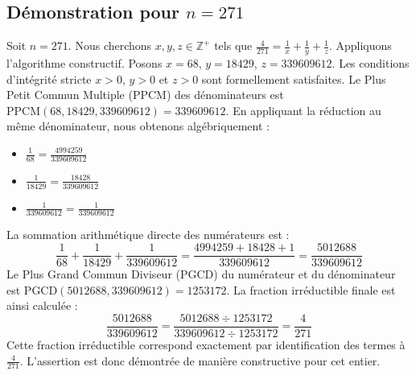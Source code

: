 \documentclass[11pt,a4paper]{article}
\begin{document}
\subsection{Démonstration pour $n = 271$}
Soit $n = 271$. Nous cherchons $x, y, z \in \mathbb{Z}^{+}$ tels que $\frac{4}{271} = \frac{1}{x} + \frac{1}{y} + \frac{1}{z}$.
Appliquons l'algorithme constructif. Posons $x = 68$, $y = 18429$, $z = 339609612$.
Les conditions d'intégrité stricte $x > 0$, $y > 0$ et $z > 0$ sont formellement satisfaites.
Le Plus Petit Commun Multiple (PPCM) des dénominateurs est $\text{PPCM}(68, 18429, 339609612) = 339609612$.
En appliquant la réduction au même dénominateur, nous obtenons algébriquement :
\begin{itemize}
    \item $\frac{1}{68} = \frac{4994259}{339609612}$
    \item $\frac{1}{18429} = \frac{18428}{339609612}$
    \item $\frac{1}{339609612} = \frac{1}{339609612}$
\end{itemize}
La sommation arithmétique directe des numérateurs est :
$$ \frac{1}{68} + \frac{1}{18429} + \frac{1}{339609612} = \frac{4994259 + 18428 + 1}{339609612} = \frac{5012688}{339609612} $$
Le Plus Grand Commun Diviseur (PGCD) du numérateur et du dénominateur est $\text{PGCD}(5012688, 339609612) = 1253172$.
La fraction irréductible finale est ainsi calculée :
$$ \frac{5012688}{339609612} = \frac{5012688 \div 1253172}{339609612 \div 1253172} = \frac{4}{271} $$
Cette fraction irréductible correspond exactement par identification des termes à $\frac{4}{271}$. L'assertion est donc démontrée de manière constructive pour cet entier.
\end{document}
